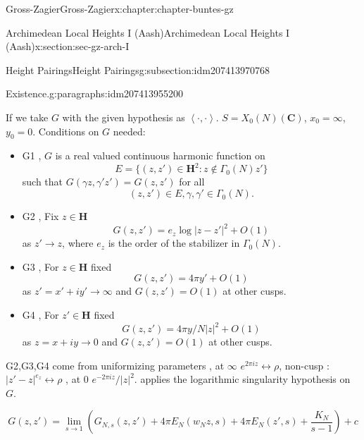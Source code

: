 \documentclass[oneside,10pt,]{book}
\numberwithin{equation}{section}
\newcommand{\pair}[2]{\left\langle #1, #2 \right\rangle}
\newcommand{\CC}{\mathbf{C}}
\newcommand{\HH}{\mathbf{H}}
\begin{document}
\begin{chapterptx}{Gross-Zagier}{}{Gross-Zagier}{}{}{x:chapter:chapter-buntes-gz}
\begin{sectionptx}{Archimedean Local Heights I (Aash)}{}{Archimedean Local Heights I (Aash)}{}{}{x:section:sec-gz-arch-I}
\begin{subsectionptx}{Height Pairings}{}{Height Pairings}{}{}{g:subsection:idm207413970768}
\begin{paragraphs}{Existence.}{g:paragraphs:idm207413955200}
\begin{equation*}
\end{equation*}
%
\par
If we take \(G\) with the given hypothesis as \(\pair\cdot\cdot\). \(S  = X_0(N)(\CC)\), \(x_0 = \infty \), \(y_0 = 0\). Conditions on \(G\) needed:%
\begin{itemize}[label=\textbullet]
\item{}G1 , \(G\) is a real valued continuous harmonic function on%
\begin{equation*}
E = \{ (z,z') \in \HH^2 : z\not \in \Gamma _0(N) z'\}
\end{equation*}
such that \(G(\gamma  z, \gamma 'z') = G(z,z')\) for all%
\begin{equation*}
(z,z')\in E, \gamma ,\gamma '\in \Gamma _0(N)\text{.}
\end{equation*}
%
\item{}G2 , Fix \(z\in \HH\)%
\begin{equation*}
G(z,z') = e_z\log|z- z'|^2 + O(1)
\end{equation*}
as \(z'\to z\), where \(e_z\) is the order of the stabilizer in \(\Gamma _0(N)\).%
\item{}G3 , For \(z\in \HH\) fixed%
\begin{equation*}
G(z,z') = 4\pi  y' + O(1)
\end{equation*}
as \(z' = x' + iy' \to \infty \) and \(G(z,z') = O(1)\) at other cusps.%
\item{}G4 , For \(z'\in \HH\) fixed%
\begin{equation*}
G(z,z') = 4\pi  y/N|z|^2 + O(1)
\end{equation*}
as \(z = x + iy \to 0 \) and \(G(z,z') = O(1)\) at other cusps.%
\end{itemize}
%
\par
G2,G3,G4 come from uniformizing parameters , at \(\infty \) \(e^{2\pi i z} \leftrightarrow \rho \), non-cusp : \(|z' -z|^{e_z} \leftrightarrow \rho \) , at 0 \(e^{-2\pi i z}/|z|^2\). applies the logarithmic singularity hypothesis on \(G\).%
\par
%
\begin{equation*}
G(z,z') = \lim_{s\to 1} \left( G_{N,s} (z,z') + 4 \pi  E_N(w_N z, s) + 4 \pi  E_N(z', s) + \frac{K_N}{s-1}\right) + c
\end{equation*}
%
\end{paragraphs}%
\end{subsectionptx}
\end{sectionptx}
\end{chapterptx}
%
\backmatter
%
%
\end{document}
